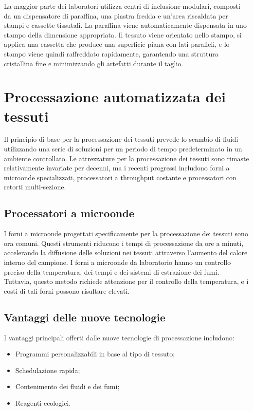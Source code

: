 La maggior parte dei laboratori utilizza centri di inclusione modulari, composti da un dispensatore di paraffina, una piastra fredda e un'area riscaldata per stampi e cassette tissutali. La paraffina viene automaticamente dispensata in uno stampo della dimensione appropriata. Il tessuto viene orientato nello stampo, si applica una cassetta che produce una superficie piana con lati paralleli, e lo stampo viene quindi raffreddato rapidamente, garantendo una struttura cristallina fine e minimizzando gli artefatti durante il taglio.

\section{Processazione automatizzata dei tessuti}
Il principio di base per la processazione dei tessuti prevede lo scambio di fluidi utilizzando una serie di soluzioni per un periodo di tempo predeterminato in un ambiente controllato. Le attrezzature per la processazione dei tessuti sono rimaste relativamente invariate per decenni, ma i recenti progressi includono forni a microonde specializzati, processatori a throughput costante e processatori con retorti multi-sezione.

\subsection{Processatori a microonde}
I forni a microonde progettati specificamente per la processazione dei tessuti sono ora comuni. Questi strumenti riducono i tempi di processazione da ore a minuti, accelerando la diffusione delle soluzioni nei tessuti attraverso l'aumento del calore interno del campione. I forni a microonde da laboratorio hanno un controllo preciso della temperatura, dei tempi e dei sistemi di estrazione dei fumi. Tuttavia, questo metodo richiede attenzione per il controllo della temperatura, e i costi di tali forni possono risultare elevati.

\subsection{Vantaggi delle nuove tecnologie}
I vantaggi principali offerti dalle nuove tecnologie di processazione includono:
\begin{itemize}
    \item Programmi personalizzabili in base al tipo di tessuto;
    \item Schedulazione rapida;
    \item Contenimento dei fluidi e dei fumi;
    \item Reagenti ecologici.
\end{itemize}

